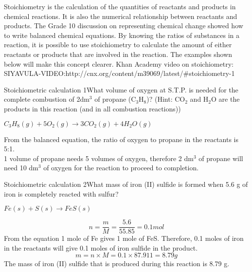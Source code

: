 Stoichiometry is the calculation of the quantities of reactants and products in chemical reactions. It is also the numerical relationship between reactants and products. The Grade 10 discussion on representing chemical change%
showed how to write balanced chemical equations. By knowing the ratios of substances in a reaction, it is possible to use stoichiometry to calculate the amount of either reactants or products that are involved in the reaction. The examples shown below will make this concept clearer.
Khan Academy video on stoichiometry: SIYAVULA-VIDEO:http://cnx.org/content/m39069/latest/#stoichiometry-1
\begin{wex}{Stoichiometric calculation 1}{What volume of oxygen at S.T.P. is needed for the complete combustion of 2dm$^{3}$ of propane (C$_{3}$H$_{8}$)? (Hint: CO$_{2}$ and H$_{2}$O are the products in this reaction (and in all combustion reactions))\\}

{
\begin{center}
\rm${C_{3}H_{8}(g) + 5O_{2}(g) \rightarrow 3CO_{2}(g) + 4H_{2}O(g)}$\\
\end{center}


From the balanced equation, the ratio of oxygen to propane in the reactants is 5:1. \\

1 volume of propane needs 5 volumes of oxygen, therefore 2 dm$^{3}$ of propane will need 10 dm$^{3}$ of oxygen for the reaction to proceed to completion.}
\end{wex}

\begin{wex}{Stoichiometric calculation 2}{What mass of iron (II) sulfide is formed when 5.6 g of iron is completely reacted with sulfur?\\}
{
\begin{center}
\rm${Fe(s) + S(s) \rightarrow FeS(s)}$
\end{center}

\begin{equation*}
n = \frac{m}{M} = \frac{5.6}{55.85} = 0.1 mol
\end{equation*}
From the equation 1 mole of Fe gives 1 mole of FeS. Therefore, 0.1 moles of iron in the reactants will give 0.1 moles of iron sulfide in the product.\\
\begin{equation*}
m = n \times M = 0.1 \times 87.911 = 8.79 g
\end{equation*}
The mass of iron (II) sulfide that is produced during this reaction is 8.79 g.}
\end{wex}

